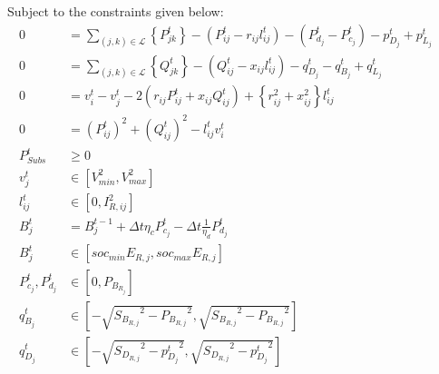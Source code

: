\documentclass[../../outputs/main.tex]{subfiles}
\begin{document}
Subject to the constraints  given below:
\begin{align}
    {0} &= {\sum_{(j, k) \in \mathcal{L}} \left\{P_{jk}^t\right\} - \left(P_{ij}^t - r_{ij}l_{ij}^t\right) - \left(P_{d_j}^t - P_{c_j}^t\right) - p^t_{D_j} + p^t_{L_j}} && \label{eq:RealPowerBalanceNodej} \\ 
    {0} &= {\sum_{(j, k) \in \mathcal{L}} \left\{Q_{jk}^t\right\} - \left(Q_{ij}^t - x_{ij}l_{ij}^t\right) - q_{D_j}^t - q_{B_j}^t + q^t_{L_j}} && \label{eq:ReactivePowerBalanceNodej} \\ 
    {0} &= {v_{i}^t - v_j^t - 2(r_{ij}P_{ij}^t + x_{ij}Q_{ij}^t) + \left\{r_{ij}^2 + x_{ij}^2\right\}l_{ij}^t} \label{eq:KVL-branch-ij} && \\
    {0} &= {(P_{ij}^{t})^2 + (Q_{ij}^{t})^2 - l_{ij}^t v_i^t} \label{eq:ApparentPowerEquationBFM} && \\
    {P^t_{Subs}} &\geq {0} \label{eq:substationRealPowerLimits} \\
    { v^{t}_{j} } &\in { \left[ V^{2}_{min}, V^{2}_{max} \right]} \label{eq:lim_vj} && \\
    { l^{t}_{ij} } &\in { \left[ 0, I^{2}_{R, ij}
    \right] } \label{eq:lim_lij} && \\
    { B_{j}^{t} } &= {  B_{j}^{t-1} + \Delta t  \eta_c P_{c_j}^t - \Delta t\frac{1}{\eta_d} P_{d_j}^t } \label{eq:Bj} &&  \\
    { B^{t}_{j} } &\in { \left[ soc_{min}E_{R, j}, soc_{max}E_{R, j} \right] } \label{eq:lim_Bj} && \\
    { P^{t}_{c_{j}}, P^{t}_{d_{j}} }
    &\in
    { \left[ 0, P_{B_{R_{j}}} \right]} \label{eq:lim_PcPdj} && \\
    { q^{t}_{B_{j}} } 
    &\in 
    { \left[-\sqrt{ {S_{B_{R, j}}}^2 - {P_{B_{R, j}}}^2}, \sqrt{ {S_{B_{R, j}}}^2 - {P_{B_{R, j}}}^2}\right] } \label{eq:qBj} && \\
    { q^{t}_{D_{j}} } 
    &\in
    { \left[-\sqrt{ {S_{D_{R, j}}}^2 - {p^{t}_{D_{j}}}^2}, \sqrt{ {S_{D_{R, j}}}^2 - {p^{t}_{D_{j}}}^2}\right] } \label{eq:qDj} &&
\end{align}
\end{document}
